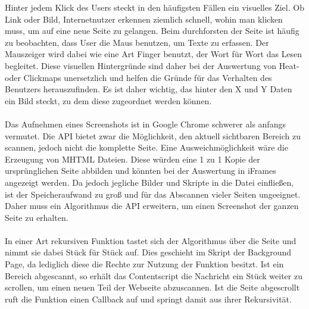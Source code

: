 Hinter jedem Klick des Users steckt in den häufigsten Fällen ein visuelles Ziel. Ob Link oder Bild, Internetnutzer erkennen ziemlich schnell, wohin man klicken muss, um auf eine neue Seite zu gelangen. Beim durchforsten der Seite ist häufig zu beobachten, dass User die Maus benutzen, um Texte zu erfassen. Der Mauszeiger wird dabei wie eine Art Finger benutzt, der Wort für Wort das Lesen begleitet. Diese visuellen Hintergründe sind daher bei der Auswertung von Heat- oder Clickmaps unersetzlich und helfen die Gründe für das Verhalten des Benutzers herauszufinden. Es ist daher wichtig, das hinter den X und Y Daten ein Bild steckt, zu dem diese zugeordnet werden können.\\
\\
Das Aufnehmen eines Screenshots ist in Google Chrome schwerer als anfangs vermutet. Die API bietet zwar die Möglichkeit, den aktuell sichtbaren Bereich zu scannen, jedoch nicht die komplette Seite. Eine Ausweichmöglichkeit wäre die Erzeugung von \Gls{MHTML} Dateien. Diese würden eine 1 zu 1 Kopie der ursprünglichen Seite abbilden und könnten bei der Auswertung in iFrames angezeigt werden. Da jedoch jegliche Bilder und Skripte in die Datei einfließen, ist der Speicheraufwand zu groß und für das Abscannen vieler Seiten ungeeignet. Daher muss ein Algorithmus die API erweitern, um einen Screenshot der ganzen Seite zu erhalten.\\
\\
In einer Art rekursiven Funktion tastet sich der Algorithmus über die Seite und nimmt sie dabei Stück für Stück auf. Dies geschieht im Skript der Background Page, da lediglich diese die Rechte zur Nutzung der Funktion besitzt. Ist ein Bereich abgescannt, so erhält das Contentscript die Nachricht ein Stück weiter zu scrollen, um einen neuen Teil der Webseite abzuscannen. Ist die Seite abgescrollt ruft die Funktion einen Callback auf und springt damit aus ihrer Rekursivität.
\\
